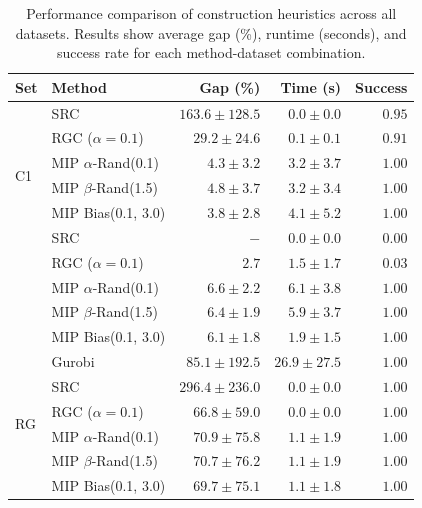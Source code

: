\begin{table}[h]
    \caption{Performance comparison of construction heuristics across all datasets. Results show average gap (\%), runtime (seconds), and success rate for each method-dataset combination.}
    \label{tab:construction_comparison}
    \centering
    \setlength{\tabcolsep}{2.1pt}
    \begin{tabular}{llrrr}
        \toprule
        \textbf{Set} & \textbf{Method} & \textbf{Gap (\%)} & \textbf{Time (s)} & \textbf{Success} \\
        \midrule
        \multirow[c]{6}{*}{C1} & SRC & $163.6 \pm 128.5$ & $0.0 \pm 0.0$ & $0.95$ \\
        & RGC ($\alpha = 0.1$) & $29.2 \pm 24.6$ & $0.1 \pm 0.1$ & $0.91$ \\
        & MIP $\alpha$-Rand(0.1) & $4.3 \pm 3.2$ & $3.2 \pm 3.7$ & $1.00$ \\
        & MIP $\beta$-Rand(1.5) & $4.8 \pm 3.7$ & $3.2 \pm 3.4$ & $1.00$ \\
        & MIP Bias(0.1, 3.0) & $\mathbf{3.8 \pm 2.8}$ & $4.1 \pm 5.2$ & $1.00$ \\
        \midrule
        \multirow[c]{6}{*}{C2} & SRC & $-$ & $0.0 \pm 0.0$ & $0.00$ \\
        & RGC ($\alpha = 0.1$) & $2.7$ & $1.5 \pm 1.7$ & $0.03$ \\
        & MIP $\alpha$-Rand(0.1) & $6.6 \pm 2.2$ & $6.1 \pm 3.8$ & $1.00$ \\
        & MIP $\beta$-Rand(1.5) & $6.4 \pm 1.9$ & $5.9 \pm 3.7$ & $1.00$ \\
        & MIP Bias(0.1, 3.0) & $\mathbf{6.1 \pm 1.8}$ & $1.9 \pm 1.5$ & $1.00$ \\
        \midrule
        \multirow[c]{6}{*}{RG} & Gurobi & $85.1 \pm 192.5$ & $26.9 \pm 27.5$ & $1.00$ \\
        & SRC & $296.4 \pm 236.0$ & $0.0 \pm 0.0$ & $1.00$ \\
        & RGC ($\alpha = 0.1$) & $66.8 \pm 59.0$ & $0.0 \pm 0.0$ & $1.00$ \\
        & MIP $\alpha$-Rand(0.1) & $70.9 \pm 75.8$ & $1.1 \pm 1.9$ & $1.00$ \\
        & MIP $\beta$-Rand(1.5) & $70.7 \pm 76.2$ & $1.1 \pm 1.9$ & $1.00$ \\
        & MIP Bias(0.1, 3.0) & $\mathbf{69.7 \pm 75.1}$ & $1.1 \pm 1.8$ & $1.00$ \\
        \bottomrule
    \end{tabular}
\end{table}

